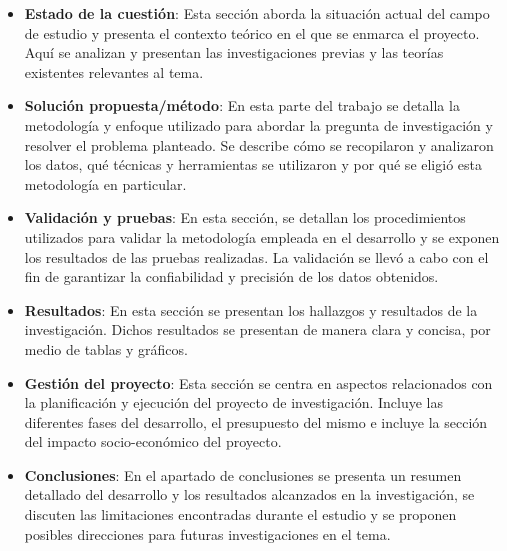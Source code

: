\begin{itemize}
    \item \textbf{Estado de la cuestión}: Esta sección aborda la situación actual del campo de estudio y presenta el contexto teórico en el que se enmarca el proyecto. Aquí se analizan y presentan las investigaciones previas y las teorías existentes relevantes al tema. 
    \item \textbf{Solución propuesta/método}: En esta parte del trabajo se detalla la metodología y enfoque utilizado para abordar la pregunta de investigación y resolver el problema planteado. Se describe cómo se recopilaron y analizaron los datos, qué técnicas y herramientas se utilizaron y por qué se eligió esta metodología en particular.
    \item \textbf{Validación y pruebas}: En esta sección, se detallan los procedimientos utilizados para validar la metodología empleada en el desarrollo y se exponen los resultados de las pruebas realizadas. La validación se llevó a cabo con el fin de garantizar la confiabilidad y precisión de los datos obtenidos.
    \item \textbf{Resultados}: En esta sección se presentan los hallazgos y resultados de la investigación. Dichos resultados se presentan de manera clara y concisa, por medio de tablas y gráficos.
    \item \textbf{Gestión del proyecto}: Esta sección se centra en aspectos relacionados con la planificación y ejecución del proyecto de investigación. Incluye las diferentes fases del desarrollo, el presupuesto del mismo e incluye la sección del impacto socio-económico del proyecto.
    \item \textbf{Conclusiones}: En el apartado de conclusiones se presenta un resumen detallado del desarrollo y los resultados alcanzados en la investigación, se discuten las limitaciones encontradas durante el estudio y se proponen posibles direcciones para futuras investigaciones en el tema.
\end{itemize}